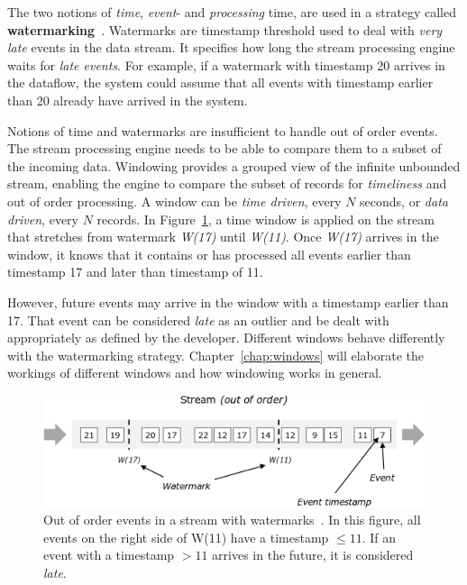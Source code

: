 The two notions of \emph{time}, \emph{event}- and \emph{processing} time,
are used in a strategy called \textbf{watermarking}~\cite{watermark_millwheel}. 
Watermarks are timestamp threshold used to deal with \emph{very late} events 
in the data stream. It specifies how long the stream processing engine 
waits for \emph{late events}. For example, if a watermark with timestamp 
20 arrives in the dataflow, the system could assume that all events 
with timestamp earlier than 20 already have arrived in the system. 

Notions of time and watermarks are insufficient to handle out of order 
events. The stream processing engine needs to be able to compare them to a subset of the 
incoming data. Windowing provides a grouped view of the infinite unbounded stream, 
enabling the engine to compare the subset of records for \emph{timeliness} and out of order 
processing. A window can be \emph{time driven}, every $N$ seconds, or \emph{data driven}, 
every $N$ records. 
In Figure~\ref{fig:watermark}, a time window is applied on the stream that
stretches from watermark \emph{W(17)} until \emph{W(11)}. 
Once \emph{W(17)} arrives in the window, it knows that it contains or has 
processed all events earlier than timestamp 17 and later than timestamp of 11.  

However, future events may arrive in the window 
with a timestamp earlier than 17. That event can be considered \emph{late} as an outlier and 
be dealt with appropriately as defined by the developer. Different windows 
behave differently with the watermarking strategy. Chapter~\ref{chap:windows}
will elaborate the workings of different windows and how windowing works in 
general. 


\begin{figure}[htpb]
    \centering
    \includegraphics[width=0.8\linewidth]{fig/stream_watermark_out_of_order.png}
    \caption{Out of order events in a stream with watermarks~\cite{watermark_flink}. In this figure, 
    all events on the right side of W(11) have a timestamp $\le 11$. If an event with 
    a timestamp $> 11$ arrives in the future, it is considered \emph{late}.}
    \label{fig:watermark}
\end{figure}


